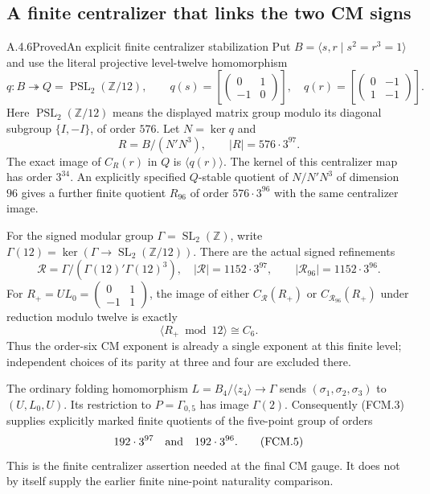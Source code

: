 \subsection{A finite centralizer that links the two CM signs}

\begin{result}{A.4.6}{Proved}{An explicit finite centralizer stabilization}
Put $B=\langle s,r\mid s^2=r^3=1\rangle$ and use the literal
projective level-twelve homomorphism
\[
 q:B\twoheadrightarrow Q=\operatorname{PSL}_2(\mathbb Z/12),
 \qquad
 q(s)=\left[\begin{pmatrix}0&1\\-1&0\end{pmatrix}\right],
 \quad q(r)=\left[\begin{pmatrix}0&-1\\1&-1\end{pmatrix}\right].
                                                               \tag{FCM.1}
\]
Here $\operatorname{PSL}_2(\mathbb Z/12)$ means the displayed
matrix group modulo its diagonal subgroup $\{I,-I\}$, of order
$576$.  Let $N=\ker q$ and
\[
 R=B/(N'N^3),\qquad |R|=576\cdot3^{97}.
                                                               \tag{FCM.2}
\]
The exact image of $C_R(r)$ in $Q$ is $\langle q(r)\rangle$.
The kernel of this centralizer map has order $3^{34}$.
An explicitly specified $Q$-stable quotient of $N/N'N^3$ of
dimension $96$ gives a further finite quotient $R_{96}$ of order
$576\cdot3^{96}$ with the same centralizer image.

For the signed modular group $\Gamma=\operatorname{SL}_2(\mathbb Z)$,
write $\Gamma(12)=\ker(\Gamma\to\operatorname{SL}_2(\mathbb Z/12))$.
There are the actual signed refinements
\[
 \mathscr R=\Gamma/(\Gamma(12)'\Gamma(12)^3),
 \quad |\mathscr R|=1152\cdot3^{97},
 \qquad |\mathscr R_{96}|=1152\cdot3^{96}.               \tag{FCM.3}
\]
For $R_+=UL_0=\left(\begin{smallmatrix}0&1\\-1&1\end{smallmatrix}\right)$,
the image of either $C_{\mathscr R}(R_+)$ or
$C_{\mathscr R_{96}}(R_+)$ under reduction modulo twelve is exactly
\[
 \langle R_+\bmod12\rangle\cong C_6.                    \tag{FCM.4}
\]
Thus the order-six CM exponent is already a single exponent at
this finite level; independent choices of its parity at three
and four are excluded there.

The ordinary folding homomorphism
$L=B_4/\langle z_4\rangle\to\Gamma$ sends
$(\sigma_1,\sigma_2,\sigma_3)$ to $(U,L_0,U)$.
Its restriction to $P=\Gamma_{0,5}$ has image $\Gamma(2)$.
Consequently (FCM.3) supplies explicitly marked finite quotients
of the five-point group of orders
\[
 192\cdot3^{97}\quad\hbox{and}\quad192\cdot3^{96}.
                                                               \tag{FCM.5}
\]
This is the finite centralizer assertion needed at the final
CM gauge.  It does not by itself supply the earlier finite
nine-point naturality comparison.
\end{result}

